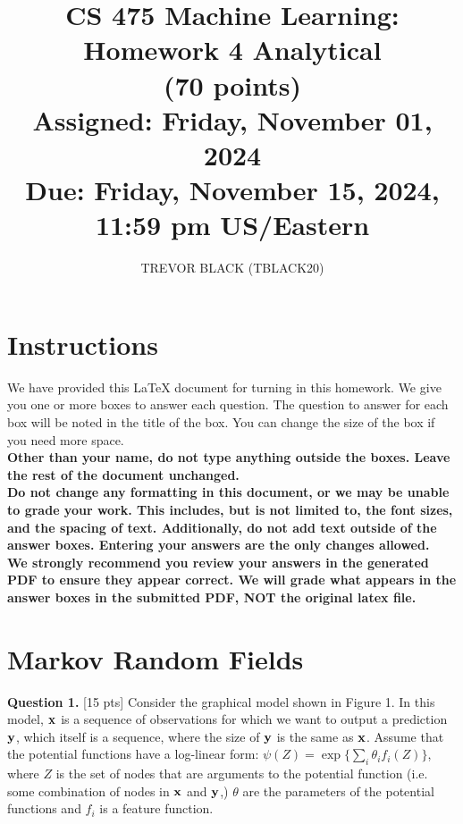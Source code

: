 \documentclass[11pt]{article}
\title{CS 475 Machine Learning: Homework 4 Analytical \\
(70 points)\\
\Large{Assigned: Friday, November 01, 2024} \\
\Large{Due: Friday, November 15, 2024, 11:59 pm US/Eastern}}
\author{TREVOR BLACK (TBLACK20)}
\date{}
\newcommand{\vx}{{\bf x}}
\newcommand{\vy}{{\bf y}}
\begin{document}
\maketitle
\thispagestyle{headings}

\section*{Instructions }
We have provided this \LaTeX{} document for turning in this homework. We give you one or more boxes to answer each question.  The question to answer for each box will be noted in the title of the box.  You can change the size of the box if you need more space.\\

{\bf Other than your name, do not type anything outside the boxes. Leave the rest of the document unchanged.}\\


\textbf{Do not change any formatting in this document, or we may be unable to
  grade your work. This includes, but is not limited to, the font sizes, and the spacing of text.  Additionally, do
  not add text outside of the answer boxes. Entering your answers are the only
  changes allowed.}\\


\textbf{We strongly recommend you review your answers in the generated PDF to
  ensure they appear correct. We will grade what appears in the answer boxes in
  the submitted PDF, NOT the original latex file.}

\pagebreak
\section*{Markov Random Fields}
\textbf{Question 1.} [15 pts]
Consider the graphical model shown in Figure 1. In this model, $\vx$ is a sequence of observations for which we want to output a prediction $\vy$, which itself is a sequence, where the size of $\vy$ is the same as $\vx$. Assume that the potential functions have a log-linear form: $\psi(Z) = \exp\{\sum_i \theta_i f_i(Z)\}$, where $Z$ is the set of nodes that are arguments to the potential function (i.e. some combination of nodes in $\vx$ and $\vy$,) $\theta$ are the parameters of the potential functions and $f_i$ is a feature function.
\end{document}
